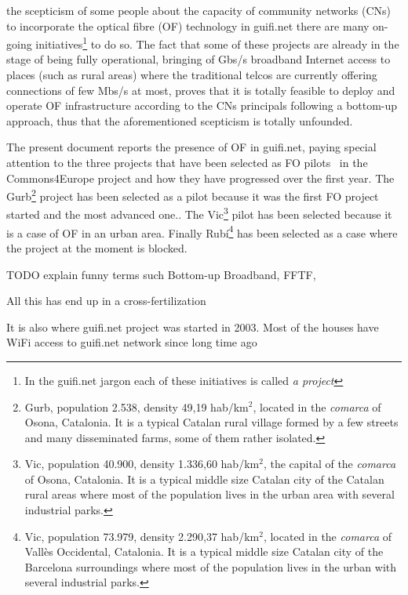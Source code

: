  the scepticism of some people about the capacity of community networks (CNs) to incorporate the optical fibre (OF) technology in guifi.net there are many on-going initiatives\footnote{In the guifi.net jargon each of these initiatives is called \emph{a project}} to do so. The fact that some of these projects are already in the stage of being fully operational, bringing of Gbs/s broadband Internet access to places (such as rural areas) where the traditional telcos are currently offering connections of few Mbs/s at most, proves that it is totally feasible to deploy and operate OF infrastructure according to the CNs principals following a bottom-up approach, thus that the aforementioned scepticism is totally unfounded.

The present document reports the presence of OF in guifi.net, paying special attention to the three projects that have been selected as FO pilots~\cite{barcelo2012bub} in the Commons4Europe project and how they have progressed over the first year. The Gurb\footnote{Gurb, population 2.538, density 49,19 hab/km$^{2}$, located in the \emph{comarca} of Osona, Catalonia. It is a typical Catalan rural village formed by a few streets and many disseminated farms, some of them rather isolated.} project has been selected as a pilot because it was the first FO project started and the most advanced one.. The Vic\footnote{Vic, population 40.900, density 1.336,60 hab/km$^{2}$, the capital of the \emph{comarca} of Osona, Catalonia. It is a typical middle size Catalan city of the Catalan rural areas where most of the population lives in the urban area with several industrial parks.} pilot has been selected because it is a case of OF in an urban area. Finally Rub\'{i}\footnote{Vic, population 73.979, density 2.290,37 hab/km$^{2}$, located in the \emph{comarca} of Vall\`{e}s Occidental, Catalonia. It is a typical middle size Catalan city of the Barcelona surroundings where most of the population lives in the urban with several industrial parks.} has been selected as a case where the project at the moment is blocked.



TODO explain funny terms such Bottom-up Broadband, FFTF,

 All this has end up in a cross-fertilization 


 It is also where guifi.net project was started in 2003. Most of the houses have WiFi access to guifi.net network since long time ago

%
